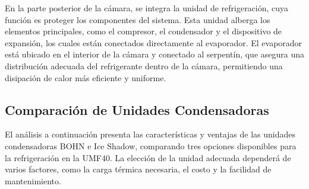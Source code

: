  
 En la parte posterior de la cámara, se integra la unidad de refrigeración, cuya función es proteger los componentes del sistema. Esta unidad alberga los elementos principales, como el compresor, el condensador y el dispositivo de expansión, los cuales están conectados directamente al evaporador. El evaporador está ubicado en el interior de la cámara y conectado al serpentín, que asegura una distribución adecuada del refrigerante dentro de la cámara, permitiendo una disipación de calor más eficiente y uniforme.
 

 
 \subsection{Comparación de Unidades Condensadoras}
 
 El análisis a continuación presenta las características y ventajas de las unidades condensadoras BOHN e Ice Shadow, comparando tres opciones disponibles para la refrigeración en la UMF40. La elección de la unidad adecuada dependerá de varios factores, como la carga térmica necesaria, el costo y la facilidad de mantenimiento.
 
